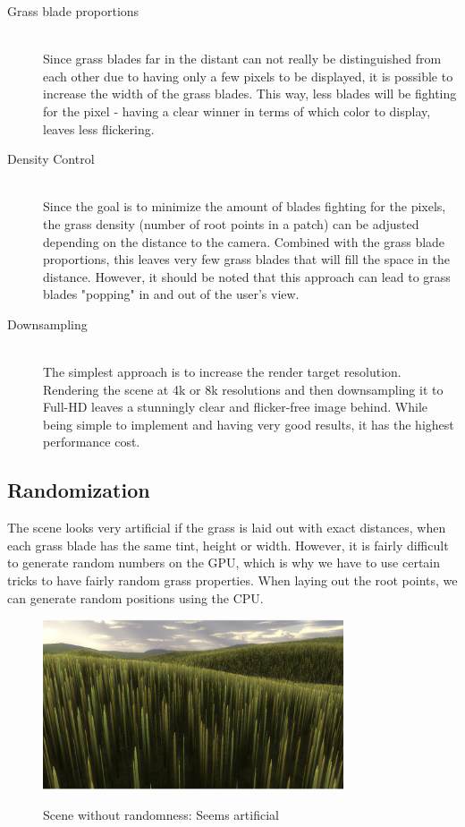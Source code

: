 \documentclass[conference]{acmsiggraph}
\begin{document}
\begin{description}
  \item[Grass blade proportions] \hfill \\
  Since grass blades far in the distant can not really be distinguished from each other due to having only a few pixels to be displayed, it is possible to increase the width of the grass blades. This way, less blades will be fighting for the pixel - having a clear winner in terms of which color to display, leaves less flickering.
  \item[Density Control] \hfill \\
  Since the goal is to minimize the amount of blades fighting for the pixels, the grass density (number of root points in a patch) can be adjusted depending on the distance to the camera. Combined with the grass blade proportions, this leaves very few grass blades that will fill the space in the distance. However, it should be noted that this approach can lead to grass blades "popping" in and out of the user's view. \cite{KevinBoulanger}
  \item[Downsampling] \hfill \\
  The simplest approach is to increase the render target resolution. Rendering the scene at 4k or 8k resolutions and then downsampling it to Full-HD leaves a stunningly clear and flicker-free image behind. While being simple to implement and having very good results, it has the highest performance cost. 
\end{description}

\subsection{Randomization}

The scene looks very artificial if the grass is laid out with exact distances, when each grass blade has the same tint, height or width. However, it is fairly difficult to generate random numbers on the GPU, which is why we have to use certain tricks to have fairly random grass properties. When laying out the root points, we can generate random positions using the CPU.

 \begin{figure}[ht]
   \centering
   \includegraphics[width=3.5in]{images/no_randomness}
   \caption{Scene without randomness: Seems artificial} \cite{EddieLee}
 \end{figure}
\end{document}
